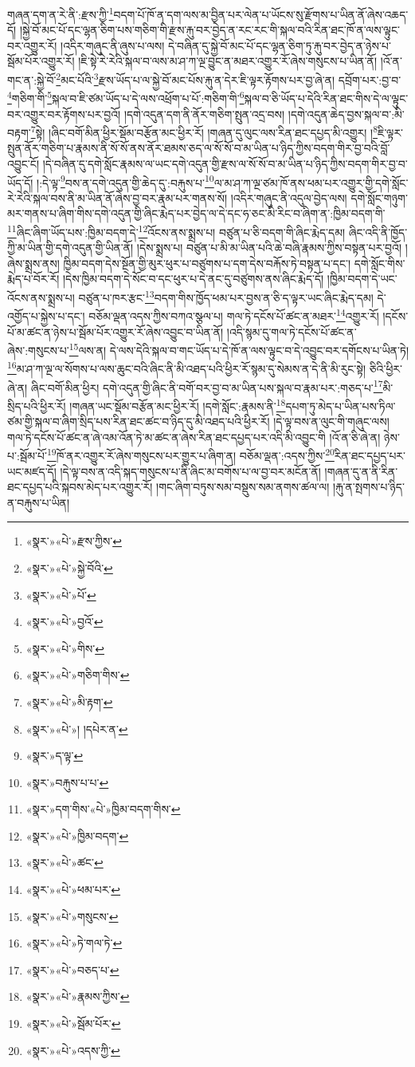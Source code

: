 གཞན་དག་ན་རེ་ནི་:རྫས་ཀྱི་\footnote{«སྣར་»«པེ་»རྫས་ཀྱིས་}བདག་པོ་ཁོ་ན་དག་ལས་མ་བྱིན་པར་ལེན་པ་ཡོངས་སུ་རྫོགས་པ་ཡིན་ནོ་ཞེས་འཆད་དོ། །སྐྱེ་བོ་མང་པོ་དང་ལྷན་ཅིག་པས་གཅིག་གི་རྫས་རྐུ་བར་བྱེད་ན་རང་རང་གི་སྐལ་བའི་རིན་ཐང་ཁོ་ན་ལས་ལྟུང་བར་འགྱུར་རོ། །འདིར་གཞུང་ནི་ཞུས་པ་ལས། དེ་བཞིན་དུ་སྐྱེ་བོ་མང་པོ་དང་ལྷན་ཅིག་ཏུ་རྐུ་བར་བྱེད་ན་ཉེས་པ་སྦོམ་པོར་འགྱུར་རོ། །ཇི་སྟེ་རེ་རེའི་སྐལ་བ་ལས་མ་ཤ་ཀ་ལྔ་བྱུང་ན་མཐར་འགྱུར་རོ་ཞེས་གསུངས་པ་ཡིན་ནོ། །འོ་ན་གང་ན་:སྐྱེ་བོ་\footnote{«སྣར་»«པེ་»སྐྱེ་བོའི་}མང་པོའི་\footnote{«སྣར་»«པེ་»པོ་}རྫས་ཡོད་པ་ལ་སྐྱེ་བོ་མང་པོས་རྐུ་ན་དེར་ཇི་ལྟར་རྟོགས་པར་བྱ་ཞེ་ན། དབྲོག་པར་:བྱ་བ་\footnote{«སྣར་»«པེ་»བྱའོ་}གཅིག་གི་\footnote{«སྣར་»«པེ་»གིས་}སྐལ་བ་ཇི་ཙམ་ཡོད་པ་དེ་ལས་འཕྲོག་པ་པོ་:གཅིག་གི་\footnote{«སྣར་»«པེ་»གཅིག་གིས་}སྐལ་བ་ཅི་ཡོད་པ་དེའི་རིན་ཐང་གིས་དེ་ལ་ལྟུང་བར་འགྱུར་བར་རྟོགས་པར་བྱའོ། །དགེ་འདུན་དག་ནི་ནོར་གཅིག་སྤུན་འདྲ་བས། །དགེ་འདུན་ཆེད་བྱས་སྐལ་བ་:མི་བརྟག་\footnote{«སྣར་»«པེ་»མི་རྟག་}སྟེ། །ཞིང་བགོ་མིན་ཕྱིར་སྡོམ་བརྩོན་མང་ཕྱིར་རོ། །གཞན་དུ་ལུང་ལས་རིན་ཐང་དཔྱད་མི་འགྱུར། །\footnote{«སྣར་»«པེ་»། །དཔེར་ན་}ཇི་ལྟར་སྤུན་ནོར་གཅིག་པ་རྣམས་ནི་སོ་སོ་ནས་ནོར་ཐམས་ཅད་ལ་སོ་སོ་བ་མ་ཡིན་པ་ཉིད་ཀྱིས་བདག་གིར་བྱ་བའི་བློ་འབྱུང་ངོ། །དེ་བཞིན་དུ་དགེ་སློང་རྣམས་ལ་ཡང་དགེ་འདུན་གྱི་རྫས་ལ་སོ་སོ་བ་མ་ཡིན་པ་ཉིད་ཀྱིས་བདག་གིར་བྱ་བ་ཡོད་དོ། །:དེ་ལྟ་\footnote{«སྣར་»ད་ལྟ་}བས་ན་དགེ་འདུན་གྱི་ཆེད་དུ་:བརྐུས་པ་\footnote{«སྣར་»བརྐུས་པ་པ་}ལ་མ་ཤ་ཀ་ལྔ་ཙམ་ཁོ་ནས་ཕམ་པར་འགྱུར་གྱི་དགེ་སློང་རེ་རེའི་སྐལ་བས་ནི་མ་ཡིན་ནོ་ཞེས་བྱ་བར་རྣམ་པར་གནས་སོ། །འདིར་གཞུང་ནི་འདུལ་བྱེད་ལས། དགེ་སློང་གཉུག་མར་གནས་པ་ཞིག་གིས་དགེ་འདུན་གྱི་ཞིང་རྨེད་པར་བྱེད་ལ་དེ་དང་ཧ་ཅང་མི་རིང་བ་ཞིག་ན་:ཁྱིམ་བདག་གི་\footnote{«སྣར་»དག་གིས་«པེ་»ཁྱིམ་བདག་གིས་}ཞིང་ཞིག་ཡོད་པས་:ཁྱིམ་བདག་དེ་\footnote{«སྣར་»«པེ་»ཁྱིམ་བདག་}འོངས་ནས་སྨྲས་པ། བཙུན་པ་ཅི་བདག་གི་ཞིང་རྨེད་དམ། ཞིང་འདི་ནི་ཁྱོད་ཀྱི་མ་ཡིན་གྱི་དགེ་འདུན་གྱི་ཡིན་ནོ། །དེས་སྨྲས་པ། བཙུན་པ་མི་མ་ཡིན་པའི་ཆེ་བཞི་རྣམས་ཀྱིས་བསྟན་པར་བྱའོ། །ཞེས་སྨྲས་ནས། ཁྱིམ་བདག་དེས་སྔོན་གྱི་མུར་ཕུར་པ་བཙུགས་པ་དག་དེས་བརྐོས་ཏེ་བསྟན་པ་དང་། དགེ་སློང་གིས་རྨེད་པ་བོར་རོ། །དེས་ཁྱིམ་བདག་དེ་སོང་བ་དང་ཕུར་པ་དེ་ནང་དུ་བཙུགས་ནས་ཞིང་རྨེད་དོ། །ཁྱིམ་བདག་དེ་ཡང་འོངས་ནས་སྨྲས་པ། བཙུན་པ་ཁར་རྩང་\footnote{«སྣར་»«པེ་»ཚང་}བདག་གིས་ཁྱོད་ཕམ་པར་བྱས་ན་ཅི་ད་ལྟར་ཡང་ཞིང་རྨེད་དམ། དེ་འགྱོད་པ་སྐྱེས་པ་དང་། བཅོམ་ལྡན་འདས་ཀྱིས་བཀའ་སྩལ་པ། གལ་ཏེ་དངོས་པོ་ཚང་ན་མཐར་\footnote{«སྣར་»«པེ་»ཕམ་པར་}འགྱུར་རོ། །དངོས་པོ་མ་ཚང་ན་ཉེས་པ་སྦོམ་པོར་འགྱུར་རོ་ཞེས་འབྱུང་བ་ཡིན་ནོ། །འདི་སྙམ་དུ་གལ་ཏེ་དངོས་པོ་ཚང་ན་ཞེས་:གསུངས་པ་\footnote{«སྣར་»«པེ་»གསུངས་}ལས་ན། དེ་ལས་དེའི་སྐལ་བ་གང་ཡོད་པ་དེ་ཁོ་ན་ལས་ལྟུང་བ་དེ་འབྱུང་བར་དགོངས་པ་ཡིན་ཏེ། \footnote{«སྣར་»«པེ་»ཏེ་གལ་ཏེ་}མ་ཤ་ཀ་ལྔ་ལ་སོགས་པ་ལས་ཆུང་བའི་ཞིང་ནི་མི་འཐད་པའི་ཕྱིར་རོ་སྙམ་དུ་སེམས་ན་དེ་ནི་མི་རུང་སྟེ། ཅིའི་ཕྱིར་ཞེ་ན། ཞིང་བགོ་མིན་ཕྱིར། དགེ་འདུན་གྱི་ཞིང་ནི་བགོ་བར་བྱ་བ་མ་ཡིན་པས་སྐལ་བ་རྣམ་པར་:གཅད་པ་\footnote{«སྣར་»«པེ་»བཅད་པ་}མི་སྲིད་པའི་ཕྱིར་རོ། །གཞན་ཡང་སྡོམ་བརྩོན་མང་ཕྱིར་རོ། །དགེ་སློང་:རྣམས་ནི་\footnote{«སྣར་»«པེ་»རྣམས་ཀྱིས་}དཔག་ཏུ་མེད་པ་ཡིན་པས་ཏིལ་ཙམ་གྱི་སྐལ་བ་ཞིག་སྲིད་པས་རིན་ཐང་ཚང་བ་ཉིད་དུ་མི་འཐད་པའི་ཕྱིར་རོ། །དེ་ལྟ་བས་ན་ལུང་གི་གཞུང་ལས། གལ་ཏེ་དངོས་པོ་ཚང་ན་ཞེ་འམ་འོན་ཏེ་མ་ཚང་ན་ཞེས་རིན་ཐང་དཔྱད་པར་འདི་མི་འབྱུང་གི །འོ་ན་ཅི་ཞེ་ན། ཉེས་པ་:སྦོམ་པོ་\footnote{«སྣར་»«པེ་»སྦོམ་པོར་}ཁོ་ནར་འགྱུར་རོ་ཞེས་གསུངས་པར་གྱུར་པ་ཞིག་ན། བཅོམ་ལྡན་:འདས་ཀྱིས་\footnote{«སྣར་»«པེ་»འདས་ཀྱི་}རིན་ཐང་དཔྱད་པར་ཡང་མཛད་དོ། །དེ་ལྟ་བས་ན་འདི་སྐད་གསུངས་པ་ནི་ཞིང་མ་བགོས་པ་ལ་བྱ་བར་མངོན་ནོ། །གཞན་དུ་ན་ནི་རིན་ཐང་དཔྱད་པའི་སྐབས་མེད་པར་འགྱུར་རོ། །གང་ཞིག་བཏུས་སམ་བསྡུས་སམ་ནགས་ཚལ་ལ། །རྐུ་ན་སྤགས་པ་ཉིད་ན་བརྐུས་པ་ཡིན། 